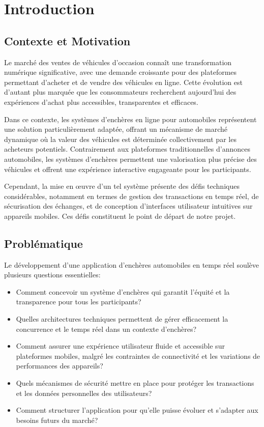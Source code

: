 \chapter{Introduction}

\section{Contexte et Motivation}

Le marché des ventes de véhicules d'occasion connaît une transformation numérique significative, avec une demande croissante pour des plateformes permettant d'acheter et de vendre des véhicules en ligne. Cette évolution est d'autant plus marquée que les consommateurs recherchent aujourd'hui des expériences d'achat plus accessibles, transparentes et efficaces.

Dans ce contexte, les systèmes d'enchères en ligne pour automobiles représentent une solution particulièrement adaptée, offrant un mécanisme de marché dynamique où la valeur des véhicules est déterminée collectivement par les acheteurs potentiels. Contrairement aux plateformes traditionnelles d'annonces automobiles, les systèmes d'enchères permettent une valorisation plus précise des véhicules et offrent une expérience interactive engageante pour les participants.

Cependant, la mise en œuvre d'un tel système présente des défis techniques considérables, notamment en termes de gestion des transactions en temps réel, de sécurisation des échanges, et de conception d'interfaces utilisateur intuitives sur appareils mobiles. Ces défis constituent le point de départ de notre projet.

\section{Problématique}

Le développement d'une application d'enchères automobiles en temps réel soulève plusieurs questions essentielles:

\begin{itemize}
    \item Comment concevoir un système d'enchères qui garantit l'équité et la transparence pour tous les participants?
    \item Quelles architectures techniques permettent de gérer efficacement la concurrence et le temps réel dans un contexte d'enchères?
    \item Comment assurer une expérience utilisateur fluide et accessible sur plateformes mobiles, malgré les contraintes de connectivité et les variations de performances des appareils?
    \item Quels mécanismes de sécurité mettre en place pour protéger les transactions et les données personnelles des utilisateurs?
    \item Comment structurer l'application pour qu'elle puisse évoluer et s'adapter aux besoins futurs du marché?
\end{itemize}

